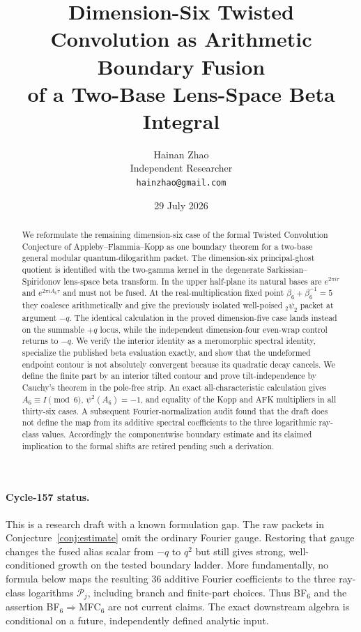 \documentclass[11pt]{article}
\title{Dimension-Six Twisted Convolution as Arithmetic Boundary Fusion\\
of a Two-Base Lens-Space Beta Integral}
\author{Hainan Zhao\\
\small Independent Researcher\\
\small\texttt{hainzhao@gmail.com}}
\date{29 July 2026}
\begin{document}
\maketitle

\begin{abstract}
We reformulate the remaining dimension-six case of the formal Twisted
Convolution Conjecture of Appleby--Flammia--Kopp as one boundary theorem
for a two-base general modular quantum-dilogarithm packet.  The
dimension-six principal-ghost quotient is identified with the
two-gamma kernel in the degenerate Sarkissian--Spiridonov lens-space
beta transform.  In the upper half-plane its natural bases are
$e^{2\pi i\tau}$ and $e^{2\pi iA_6\tau}$ and must not be fused.
At the real-multiplication fixed point
$\beta_6+\beta_6^{-1}=5$ they coalesce arithmetically and give the
previously isolated well-poised ${}_2\psi_2$ packet at argument $-q$.
The identical calculation in the proved dimension-five case lands
instead on the summable $+q$ locus, while the independent
dimension-four even-wrap control returns to $-q$.  We verify the
interior identity as a meromorphic spectral identity, specialize the
published beta
evaluation exactly, and show that the undeformed endpoint contour is
not absolutely convergent because its quadratic decay cancels.  We
define the finite part by an interior tilted contour and prove
tilt-independence by Cauchy's theorem in the pole-free strip.  An
exact all-characteristic calculation gives
$A_6\equiv I\pmod6$, $\psi^2(A_6)=-1$, and equality of the Kopp and AFK
multipliers in all thirty-six cases. A subsequent Fourier-normalization
audit found that the draft does not define the map from its additive
spectral coefficients to the three logarithmic ray-class values.
Accordingly the componentwise boundary estimate and its claimed
implication to the formal shifts are retired pending such a derivation.
\end{abstract}

\paragraph{Cycle-157 status.}
This is a research draft with a known formulation gap.  The raw packets
in Conjecture~\ref{conj:estimate} omit the ordinary Fourier gauge.
Restoring that gauge changes the fused alias scalar from $-q$ to $q^2$
but still gives strong, well-conditioned growth on the tested boundary
ladder.  More fundamentally, no formula below maps the resulting 36
additive Fourier coefficients to the three ray-class logarithms
$\mathcal P_j$, including branch and finite-part choices.  Thus
BF$_6$ and the assertion BF$_6\Rightarrow$MFC$_6$ are not current
claims.  The exact downstream algebra is conditional on a future,
independently defined analytic input.
\end{document}

